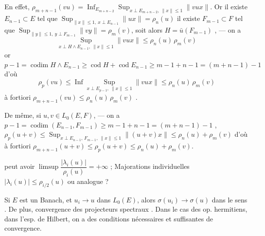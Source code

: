 \documentclass[11pt,a4paper]{article}
\begin{document}
En effet, $\rho_{m+n-1}(vu) = \operatorname*{Inf}_{E_{m+n-2}} \operatorname*{Sup}_{x \perp E_{m+n-2},\ \|x\| \leq 1} \|vux\|$. Or il existe $E_{n-1} \subset E$ tel que $\operatorname*{Sup}_{\|x\| \leq 1,\ x \perp E_{n-1}} \|ux\| = \rho_n(u)$  il existe $F_{m-1} \subset F$ tel que $\operatorname*{Sup}_{\|y\| \leq 1,\ y \perp F_{m-1}} \|vy\| = \rho_m(v)$, soit alors $H = \bar{u}(F_{m-1})$ , --- on a
\[
  \operatorname*{Sup}_{x \perp H \wedge E_{n-1},\ \|x\| \leq 1} \|vux\| \leq \rho_n(u)\, \rho_m(v)
\]
or $p - 1 = \operatorname{codim} H \wedge E_{n-1} \geq \operatorname{cod} H + \operatorname{cod} E_{n-1} \geq m - 1 + n - 1 = (m+n-1) - 1$  d'où
\[
  \rho_p(vu) \leq \operatorname{Inf} \operatorname*{Sup}_{x \perp E_{p-1},\ \|x\| \leq 1} \|vux\| \leq \rho_n(u)\, \rho_m(v)
\]
à fortiori $\rho_{m+n-1}(vu) \leq \rho_n(u)\, \rho_m(v)$ .

De même, si $u, v \in L_0(E, F)$, --- on a $p - 1 = \operatorname{codim}(E_{n-1}, F_{m-1}) \geq m - 1 + n - 1 = (m+n-1) - 1$ , $\rho_p(u+v) \leq \operatorname*{Sup}_{x \perp E_{n-1},\, F_{m-1},\ \|x\| \leq 1} \|(u+v)x\| \leq \rho_n(u) + \rho_m(v)$  d'où à fortiori $\rho_{m+n-1}(u+v) \leq \rho_p(u+v) \leq \rho_n(u) + \rho_m(v)$.

   peut avoir $\limsup \dfrac{|\lambda_i(u)|}{\rho_i(u)} = +\infty$ ; Majorations individuelles  $|\lambda_i(u)| \leq \rho_{i/2}(u)$ ou analogue ?  

 


Si $E$ est un Banach, et $u_i \to u$ dans $L_0(E)$, alors $\sigma(u_i) \to \sigma(u)$ dans le sens . De plus, convergence des projecteurs spectraux \ill{}. Dans le cas des op. hermitiens, dans l'esp. de Hilbert, on a \ill{}  des conditions nécessaires et suffisantes de convergence.
\end{document}
